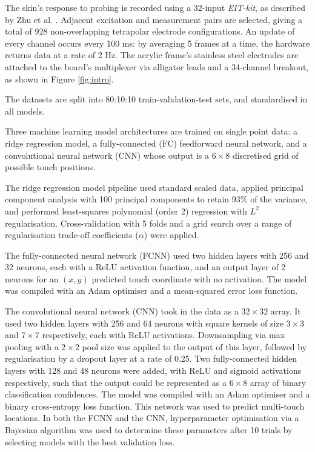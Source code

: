 The skin's response to probing is recorded using a 32-input \textit{EIT-kit}, as described by Zhu et al. \cite{Zhu2021EIT}. Adjacent excitation and measurement pairs are selected, giving a total of 928 non-overlapping tetrapolar electrode configurations. An update of every channel occurs every 100 ms: by averaging 5 frames at a time, the hardware returns data at a rate of 2 Hz. The acrylic frame's stainless steel electrodes are attached to the board's multiplexer via alligator leads and a 34-channel breakout, as shown in Figure \ref{fig:intro}.


The datasets are split into 80:10:10 train-validation-test sets, and standardised in all models.

Three machine learning model architectures are trained on single point data: a ridge regression model, a fully-connected (FC) feedforward neural network, and a convolutional neural network (CNN) whose output is a $ 6\times8 $ discretised grid of possible touch positions. 

The ridge regression model pipeline used standard scaled data, applied principal component analysis with 100 principal components to retain 93\% of the variance, and performed least-squares polynomial (order 2) regression with $ L^2 $ regularisation. Cross-validation with 5 folds and a grid search over a range of regularisation trade-off coefficients ($\alpha$) were applied. 

The fully-connected neural network (FCNN) used two hidden layers with 256 and 32 neurons, each with a ReLU activation function, and an output layer of 2 neurons for an $(x, y)$ predicted touch coordinate with no activation. The model was compiled with an Adam optimiser and a mean-squared error loss function.

The convolutional neural network (CNN) took in the data as a $ 32 \times 32 $ array. It used two hidden layers with 256 and 64 neurons with square kernels of size $ 3 \times 3 $ and $ 7 \times 7 $ respectively, each with ReLU activations. Downsampling via max pooling with a $ 2 \times 2 $ pool size was applied to the output of this layer, followed by regularisation by a dropout layer at a rate of 0.25. Two fully-connected hidden layers with 128 and 48 neurons were added, with ReLU and sigmoid activations respectively, such that the output could be represented as a $ 6 \times 8 $ array of binary classification confidences. The model was compiled with an Adam optimiser and a binary cross-entropy loss function. This network was used to predict multi-touch locations. In both the FCNN and the CNN, hyperparameter optimisation via a Bayesian algorithm was used to determine these parameters after 10 trials by selecting models with the best validation loss.

